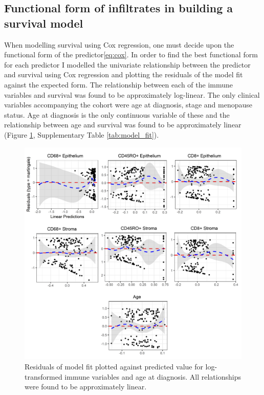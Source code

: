 \subsection{Functional form of infiltrates in building a survival model}
When modelling survival using Cox regression, one must decide upon the functional form of the predictor\ref{eq:cox}.  In order to find the best functional form for each predictor I modelled the univariate relationship between the predictor and survival using Cox regression and plotting the residuals of the model fit against the expected form. The relationship between each of the immune variables and survival was found to be approximately log-linear. The only clinical variables accompanying the cohort were age at diagnosis, stage and menopause status. Age at diagnosis is the only continuous variable of these and the relationship between age and survival was found to be approximately linear (Figure \ref{fig:modelfit}, Supplementary Table \ref{tab:model_fit}). 

\begin{figure}
    \centering
    \includegraphics[width=\textwidth]{Chapter2/Figs/Raster/modelfit_2-08.png}
    \caption[Residuals of model fit]{Residuals of model fit plotted against predicted value for log-transformed immune variables and age at diagnosis. All relationships were found to be approximately linear.}
    \label{fig:modelfit}
\end{figure}



